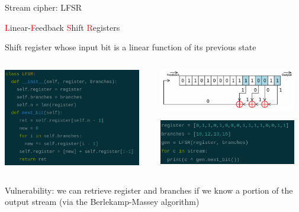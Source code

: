 \begin{frame}{Stream cipher: LFSR}

  \textcolor{red}{L}inear-\textcolor{red}{F}eedback \textcolor{red}{S}hift \textcolor{red}{R}egisters
  
  \medskip

  Shift register whose input bit is a linear function of its previous state
   
  \medskip
  
  \begin{columns}
  \begin{column}{0.5\textwidth}
    \centerline{\includegraphics[width=6cm]{img/LFSR-code.png}}
  \end{column}
  \begin{column}{0.5\textwidth}
    \centerline{\includegraphics[width=6cm]{img/lfsr.png}}

    \medskip

    \centerline{\includegraphics[width=6cm]{img/LFSR-gen.png}}
  \end{column}
  \end{columns}

  \medskip
  
  Vulnerability: we can retrieve register and branches if we know a portion of the output stream (via the Berlekamp-Massey algorithm)
  
\end{frame}
